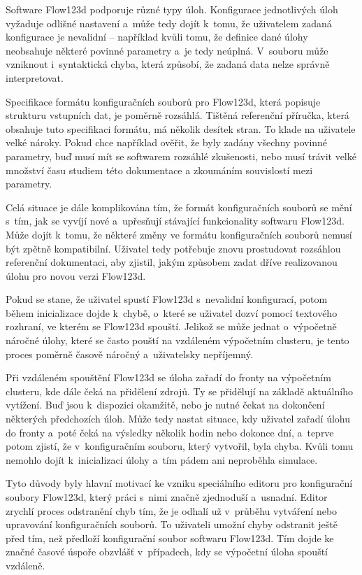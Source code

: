 \documentclass[FM,bw,DP]{tulthesis}
\begin{document}
Software Flow123d podporuje různé typy úloh. Konfigurace jednotlivých úloh vyžaduje odlišné nastavení a~může tedy dojít k~tomu, že uživatelem zadaná konfigurace je nevalidní -- například kvůli tomu, že definice dané úlohy neobsahuje některé povinné parametry a~je tedy neúplná. V~souboru může vzniknout i~syntaktická chyba, která způsobí, že zadaná data nelze správně interpretovat.

Specifikace formátu konfiguračních souborů pro Flow123d, která popisuje strukturu vstupních dat, je poměrně rozsáhlá. Tištěná referenční příručka, která obsahuje tuto specifikaci formátu, má několik desítek stran. To klade na uživatele velké nároky. Pokud chce například ověřit, že byly zadány všechny povinné parametry, buď musí mít se softwarem rozsáhlé zkušenosti, nebo musí trávit velké množství času studiem této dokumentace a zkoumáním souvislostí mezi parametry.

Celá situace je dále komplikována tím, že formát konfiguračních souborů se mění s~tím, jak se vyvíjí nové a~upřesňují stávající funkcionality softwaru Flow123d. Může dojít k~tomu, že některé změny ve formátu konfiguračních souborů nemusí být zpětně kompatibilní. Uživatel tedy potřebuje znovu prostudovat rozsáhlou referenční dokumentaci, aby zjistil, jakým způsobem zadat dříve realizovanou úlohu pro novou verzi Flow123d.

Pokud se stane, že uživatel spustí Flow123d s~nevalidní konfigurací, potom během inicializace dojde k~chybě, o~které se uživatel dozví pomocí textového rozhraní, ve kterém se Flow123d spouští. Jelikož se může jednat o~výpočetně náročné úlohy, které se často pouští na vzdáleném výpočetním clusteru, je tento proces poměrně časově náročný a~uživatelsky nepříjemný.

Při vzdáleném spouštění Flow123d se úloha zařadí do fronty na výpočetním clusteru, kde dále čeká na přidělení zdrojů. Ty se přidělují na základě aktuálního vytížení. Buď jsou k~dispozici okamžitě, nebo je nutné čekat na dokončení některých předchozích úloh. Může tedy nastat situace, kdy uživatel zařadí úlohu do fronty a~poté čeká na výsledky několik hodin nebo dokonce dní, a~teprve potom zjistí, že v~konfiguračním souboru, který vytvořil, byla chyba. Kvůli tomu nemohlo dojít k~inicializaci úlohy a~tím pádem ani neproběhla simulace.

Tyto důvody byly hlavní motivací ke vzniku speciálního editoru pro konfigurační soubory Flow123d, který práci s~nimi značně zjednoduší a~usnadní. Editor zrychlí proces odstranění chyb tím, že je odhalí už v~průběhu vytváření nebo upravování konfiguračních souborů. To uživateli umožní chyby odstranit ještě před tím, než předloží konfigurační soubor softwaru Flow123d. Tím dojde ke značné časové úspoře obzvlášť v~případech, kdy se výpočetní úloha spouští vzdáleně.
\end{document}
